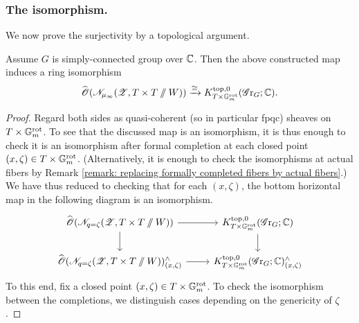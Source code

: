 \subsubsection{The isomorphism.}
We now prove the surjectivity by a topological argument.
\begin{theorem}\label{theorem: equivariant K-theory as deformation to normal cone -- G sssc}
Assume $G$ is simply-connected group over $\operatorname{\mathbb{C}}$. Then the above constructed map induces a ring isomorphism
\begin{equation*}
   \widehat{\operatorname{\mathscr{O}}}(\mathscr{N}_{\mu_{\infty}}(\operatorname{\mathscr{Z}}, T \times T \sslash W)) \xrightarrow{\cong} K^{\mathrm{top}, 0}_{T \times \mathbb{G}_m^{\mathrm{rot}}}(\operatorname{\mathscr{G}r}_G; \operatorname{\mathbb{C}}).
\end{equation*}
\end{theorem}
\begin{proof}
Regard both sides as quasi-coherent (so in particular fpqc) sheaves on $T \times \mathbb{G}_m^{\mathrm{rot}}$. To see that the discussed map is an isomorphism, it is thus enough to check it is an isomorphism after formal completion at each closed point $(x, \zeta) \in T \times \mathbb{G}_m^{\mathrm{rot}}$. (Alternatively, it is enough to check the isomorphisms at actual fibers by Remark \ref{remark: replacing formally completed fibers by actual fibers}.) We have thus reduced to checking that for each $(x, \zeta)$, the bottom horizontal map in the following diagram is an isomorphism.
\begin{equation*}
    \begin{tikzcd}
         \widehat{\O}(\eN_{q=\zeta}(\eZ, T \times T \sslash W)) \arrow[r] \arrow[d] & K^{\top, 0}_{T \times \Gm^{\rot}}(\Gr_G; \C) \arrow[d] \\
         \widehat{\O}(\eN_{q=\zeta}(\eZ, T \times T \sslash W))^{\wedge}_{(x, \zeta)} \arrow[r] & K^{\top, 0}_{T \times \Gm^{\rot}}(\Gr_G; \C)^{\wedge}_{(x, \zeta)}
    \end{tikzcd}
\end{equation*}
To this end, fix a closed point $(x, \zeta) \in T \times \mathbb{G}_m^{\mathrm{rot}}$. To check the isomorphism between the completions, we distinguish cases depending on the genericity of $\zeta$.


\end{proof}
